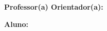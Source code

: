 \begin{center}
\textbf{\titulo}
\end{center}

\textbf{Professor(a) Orientador(a): \orientador}

\textbf{Aluno: \aluno}